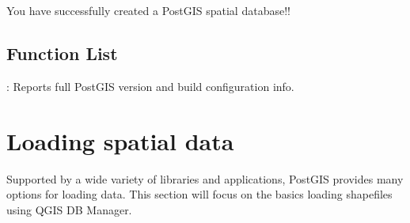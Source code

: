 \documentclass[a4paper,11pt,english]{sphinxmanual}
\begin{document}
You have successfully created a PostGIS spatial database!!


\subsection{Function List}
\label{\detokenize{setup:function-list}}
: Reports full PostGIS version and build configuration info.


\section{Loading spatial data}
\label{\detokenize{setup:loading-spatial-data}}\label{\detokenize{setup:loading-data}}
Supported by a wide variety of libraries and applications, PostGIS provides many options for loading data. This section will focus on the basics \textendash{} loading shapefiles using QGIS DB Manager.
\end{document}
